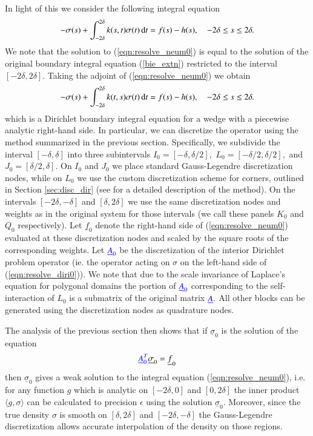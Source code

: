 In light of this we consider the following integral equation
\begin{align}\label{eqn:resolve_neum0}
-\sigma(s) + \int_{-2\delta}^{2\delta} k(s,t) \sigma(t)\,{\rm d}t = f(s)-h(s), \quad -2\delta \le s \le 2\delta.
\end{align}
We note that the solution to (\ref{eqn:resolve_neum0}) is equal to the solution of the original boundary integral equation (\ref{bie_extn}) restricted to the interval $[-2\delta,2\delta].$ Taking the adjoint of (\ref{eqn:resolve_neum0}) we obtain
\begin{align}\label{eqn:resolve_diri0}
-\sigma(s) + \int_{-2\delta}^{2\delta} k(t,s) \sigma(t)\,{\rm d}t = f(s)-h(s), \quad -2\delta \le s \le 2\delta.
\end{align}
which is a Dirichlet boundary integral equation for a wedge with a piecewise analytic right-hand side. In particular, we can discretize the operator using the method summarized in the previous section. Specifically, we subdivide the interval $[-\delta,\delta]$ into three subintervals $I_0 = [-\delta,\delta/2],$ $L_0 = [-\delta/2,\delta/2],$ and $J_0 = [\delta/2,\delta].$ On $I_0$ and $J_0$ we place standard Gauss-Legendre discretization nodes, while on $L_0$ we use the custom discretization scheme for corners, outlined in Section \ref{sec:disc_dir} (see \cite{} for a detailed description of the method). On the intervals $[-2\delta,-\delta]$ and $[\delta,2\delta]$ we use the same discretization nodes and weights as in the original system for those intervals (we call these panels $K_0$ and $Q_0$ respectively). Let $\underline{f}_0$ denote the right-hand side of (\ref{eqn:resolve_neum0}) evaluated at these discretization nodes and scaled by the square roots of the corresponding weights. Let ${\color{blue} \underline{A}_0}$ be the discretization of the interior Dirichlet problem operator (ie. the operator acting on $\sigma$ on the left-hand side of (\ref{eqn:resolve_diri0})). We note that due to the scale invariance of Laplace's equation for polygonal domains the portion of ${\color{blue} \underline{A}_0}$ corresponding to the self-interaction of $L_0$ is a submatrix of the original matrix ${\color{blue} \underline{A}}.$ All other blocks can be generated using the discretization nodes as quadrature nodes.

The analysis of the previous section then shows that if $\underline{\sigma}_0$ is the solution of the equation
\begin{align}
{\color{blue} \underline{A}_0^T} \underline{\sigma}_0 = \underline{f}_0
\end{align}
then $\underline{\sigma}_0$ gives a {weak solution} to the integral equation (\ref{eqn:resolve_neum0}), i.e. for any function $g$ which is analytic on $[-2\delta,0]$ and $[0,2\delta]$ the inner product $\langle g,\sigma \rangle$ can be calculated to precision $\epsilon$ using the solution $\underline{\sigma}_0.$ Moreover, since the true density $\sigma$ is smooth on $[\delta,2\delta]$ and $[-2\delta,-\delta]$ the Gauss-Legendre discretization allows accurate interpolation of the density on those regions.

